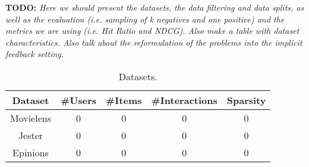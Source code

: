 \textbf{TODO: }
\textit{Here we should present the datasets, the data filtering and data splits, as well as the evaluation (i.e. sampling of k negatives and one positive) and the metrics we are using (i.e. Hit Ratio and NDCG). Also make a table with dataset characteristics. Also talk about the reformulation of the problems into the implicit feedback setting.}

\begin{table}[h]
    \centering
    \begin{tabular}{c|c|c|c|c}
        \hline
        Dataset & \#Users & \#Items & \#Interactions & Sparsity \\
        \hline
        Movielens & 0 & 0 & 0 & 0\\
        Jester    & 0 & 0 & 0 & 0\\
        Epinions  & 0 & 0 & 0 & 0
    \end{tabular}
    \caption{Datasets.}
    \label{tab:movielens}
\end{table}
